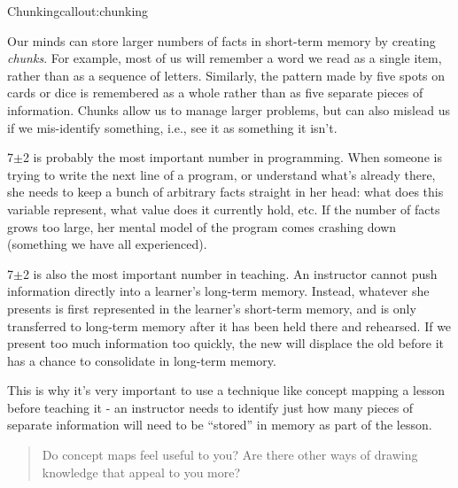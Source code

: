 \begin{callout}{Chunking}{callout:chunking}

Our minds can store larger numbers of facts in short-term memory by
creating \emph{chunks}. For example, most of us will remember a word we
read as a single item, rather than as a sequence of letters. Similarly,
the pattern made by five spots on cards or dice is remembered as a whole
rather than as five separate pieces of information. Chunks allow us to
manage larger problems, but can also mislead us if we mis-identify
something, i.e., see it as something it isn't.
\end{callout}

7$\pm$2 is probably the most important number in programming. When someone
is trying to write the next line of a program, or understand what's
already there, she needs to keep a bunch of arbitrary facts straight in
her head: what does this variable represent, what value does it
currently hold, etc. If the number of facts grows too large, her mental
model of the program comes crashing down (something we have all
experienced).

7$\pm$2 is also the most important number in teaching. An instructor cannot
push information directly into a learner's long-term memory. Instead,
whatever she presents is first represented in the learner's short-term
memory, and is only transferred to long-term memory after it has been
held there and rehearsed. If we present too much information too
quickly, the new will displace the old before it has a chance to
consolidate in long-term memory.

This is why it's very important to use a technique like concept mapping
a lesson before teaching it - an instructor needs to identify just how
many pieces of separate information will need to be ``stored'' in memory
as part of the lesson.

\begin{quote}
Do concept maps feel useful to you? Are there other ways of drawing
knowledge that appeal to you more?
\end{quote}
